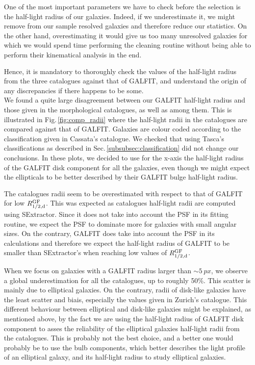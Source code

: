 One of the most important parameters we have to check before the selection is the half-light radius of our galaxies. Indeed, if we underestimate it, we might remove from our sample resolved galaxies and therefore reduce our statistics. On the other hand, overestimating it would give us too many unresolved galaxies for which we would spend time performing the cleaning routine without being able to perform their kinematical analysis in the end.
 
Hence, it is mandatory to thoroughly check the values of the half-light radius from the three catalogues against that of GALFIT, and understand the origin of any discrepancies if there happens to be some. \\

We found a quite large disagreement between our GALFIT half-light radius and those given in the morphological catalogues, as well as among them. This is illustrated in Fig.\,\ref{fig:comp_radii} where the half-light radii in the catalogues are compared against that of GALFIT. Galaxies are colour coded according to the classification given in Cassata's catalogue. We checked that using Tasca's classifications as described in Sec.\,\ref{subsubsec:classification} did not change our conclusions. In these plots, we decided to use for the x-axis the half-light radius of the GALFIT disk component for all the galaxies, even though we might expect the ellipticals to be better described by their GALFIT bulge half-light radius.

The catalogues radii seem to be overestimated with respect to that of GALFIT for low $R_{1/2 , \rm{d}}^{\rm{GF}}$. This was expected as catalogues half-light radii are computed using SExtractor. Since it does not take into account the PSF in its fitting routine, we expect the PSF to dominate more for galaxies with small angular sizes. On the contrary, GALFIT does take into account the PSF in its calculations and therefore we expect the half-light radius of GALFIT to be smaller than SExtractor's when reaching low values of $R_{1/2 , \rm{d}}^{\rm{GF}}$. 

When we focus on galaxies with a GALFIT radius larger than $\sim \SI{5}{px}$, we observe a global underestimation for all the catalogues, up to roughly 50\%. This scatter is mainly due to elliptical galaxies. On the contrary, radii of disk-like galaxies have the least scatter and biais, especially the values given in Zurich's catalogue. This different behaviour between elliptical and disk-like galaxies might be explained, as mentioned above, by the fact we are using the half-light radius of GALFIT disk component to asses the reliability of the elliptical galaxies half-light radii from the catalogues. This is probably not the best choice, and a better one would probably be to use the bulb components, which better describes the light profile of an elliptical galaxy, and its half-light radius to study elliptical galaxies.\\

